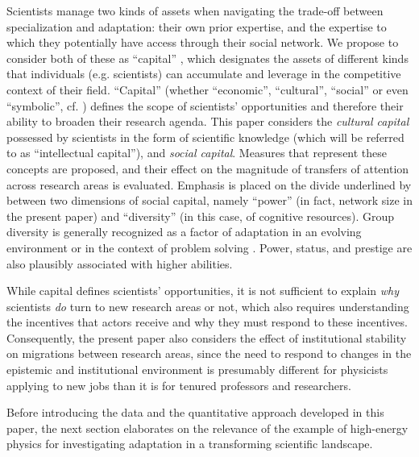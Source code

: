 \documentclass{article}
\begin{document}
Scientists manage two kinds of assets when navigating the trade-off between specialization and adaptation: their own prior expertise, and the expertise to which they potentially have access through their social network. We propose to consider both of these as ``capital'' \citep{Bourdieu1986}, which designates the assets of different kinds that individuals (e.g. scientists) can accumulate and leverage in the competitive context of their field. ``Capital''  (whether ``economic'', ``cultural'', ``social'' or even ``symbolic'', cf. \citealt{Bourdieu1986}) defines the scope of scientists' opportunities and therefore their ability to broaden their research agenda. This paper considers the \textit{cultural capital} possessed by scientists in the form of scientific knowledge (which will be referred to as ``intellectual capital''), and \textit{social capital}. %
Measures that represent these concepts are proposed, and their effect on the magnitude of transfers of attention across research areas is evaluated. Emphasis is placed on the divide underlined by \citet{Abbasi2014} between two dimensions of social capital, namely ``power'' (in fact, network size in the present paper) and ``diversity'' (in this case, of cognitive resources). Group diversity is generally recognized as a factor of adaptation in an evolving environment \citep{Schimmelpfennig2021,Muthukrishna2016,Henrich2004} or in the context of problem solving \citep{Hong2004}. Power, status, and prestige are also plausibly associated with higher abilities.

While capital defines scientists' opportunities, it is not sufficient to explain \textit{why} scientists \textit{do} turn to new research areas or not, which also requires understanding the incentives that actors receive and why they must respond to these incentives. Consequently, the present paper also considers the effect of institutional stability on migrations between research areas, since the need to respond to changes in the epistemic and institutional environment is presumably different for physicists applying to new jobs than it is for tenured professors and researchers.%

Before introducing the data and the quantitative approach developed in this paper, the next section elaborates on the relevance of the example of high-energy physics for investigating adaptation in a transforming scientific landscape. 
\end{document}
